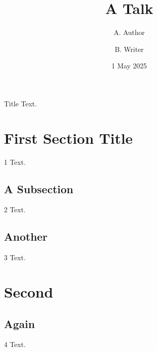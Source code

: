 \documentclass{beamer}
\title[A Rather Long Short Title]{A Talk}
\author{A. Author \and B. Writer}
\date{1 May 2025}
\begin{document}
\begin{frame}{Title}
Text.
\end{frame}
\section{First Section Title}
\begin{frame}{1}
Text.
\end{frame}
\subsection{A Subsection}
\begin{frame}{2}
Text.
\end{frame}
\subsection{Another}
\begin{frame}{3}
Text.
\end{frame}
\section[Short]{Second}
\subsection{Again}
\begin{frame}{4}
Text.
\end{frame}
\end{document}
